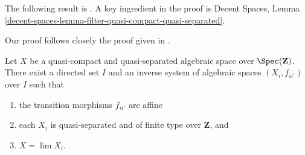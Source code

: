 \noindent
The following result is \cite[Theorem 1.2.2]{CLO}.
A key ingredient in the proof is
Decent Spaces, Lemma
\ref{decent-spaces-lemma-filter-quasi-compact-quasi-separated}.

\begin{proposition}
\label{proposition-approximate}
\begin{reference}
Our proof follows closely the proof given in \cite[Theorem 1.2.2]{CLO}.
\end{reference}
Let $X$ be a quasi-compact and quasi-separated algebraic space over
$\Spec(\mathbf{Z})$. There exist a directed set $I$
and an inverse system of algebraic spaces $(X_i, f_{ii'})$ over $I$
such that
\begin{enumerate}
\item the transition morphisms $f_{ii'}$ are affine
\item each $X_i$ is quasi-separated and of finite type over
$\mathbf{Z}$, and
\item $X = \lim X_i$.
\end{enumerate}
\end{proposition}

